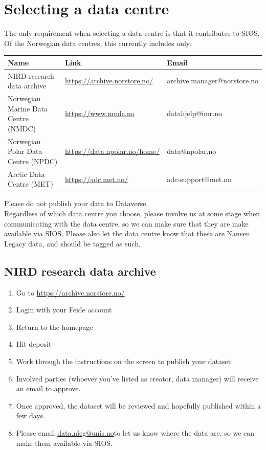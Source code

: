 \documentclass[a4paper,english, 11pt]{article}
\makeatletter
\newcommand{\emailme}{\href{mailto:data.nleg@unis.no}{data.nleg@unis.no}}
\makeatother
\begin{document}
\newpage
\section{Selecting a data centre}
\label{s:datacentre}

The only requirement when selecting a data centre is that it contributes to SIOS. Of the Norwegian data centres, this currently includes only: 

\begin{center}
\begin{tabular}{ |p{}|p{}|p{}|} 
\hline
Name & Link & Email  \\
\hline
NIRD research data archive & \url{https://archive.norstore.no/} & archive.manager@norstore.no \\  
\hline
Norwegian Marine Data Centre (NMDC) & \url{https://www.nmdc.no} & datahjelp@imr.no \\   
\hline
Norwegian Polar Data Centre (NPDC) & \url{https://data.npolar.no/home/} & data@npolar.no \\     
\hline
Arctic Data Centre (MET) & \url{https://adc.met.no/} & adc-support@met.no \\   
\hline
\end{tabular}
\end{center}

Please do not publish your data to Dataverse.\\

Regardless of which data centre you choose, please involve us at some stage when communicating with the data centre, so we can make sure that they are make available via SIOS. Please also let the data centre know that these are Nansen Legacy data, and should be tagged as such.

\subsection{NIRD research data archive}
\label{ss:NIRD}

\begin{enumerate}
\item Go to \url{https://archive.norstore.no/}
\item Login with your Feide account
\item Return to the homepage
\item Hit deposit
\item Work through the instructions on the screen to publish your dataset
\item Involved parties (whoever you've listed as creator, data manager) will receive an email to approve.
\item Once approved, the dataset will be reviewed and hopefully published within a few days.
\item Please email \emailme to let us know where the data are, so we can make them available via SIOS.
\end{enumerate}
\end{document}
